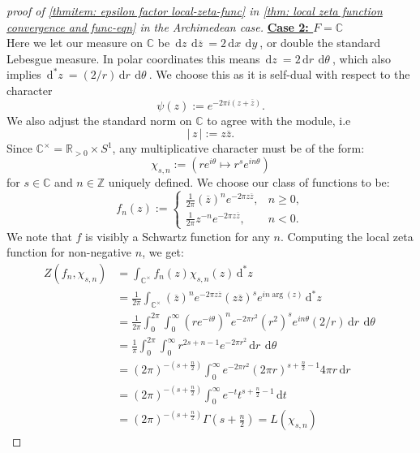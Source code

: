 \documentclass[11pt, x11names]{book}
\newcommand{\zz}{\mathbb{Z}}
\newcommand{\rr}{\mathbb{R}}
\newcommand{\cc}{\mathbb{C}}
\renewcommand{\bar}[1]{\overline{#1}}
\renewcommand{\brack}[1]{\left(   #1 \right)}
\newcommand{\abs}[1]{\left| \, #1  \,\right|}
\newcommand{\dr}{\, \mathrm{d}r \ }
\newcommand{\dt}{\, \mathrm{d}t \ }
\newcommand{\dx}{\, \mathrm{d}x \ }
\newcommand{\dy}{\, \mathrm{d}y \ }
\newcommand{\dz}{\, \mathrm{d}z \ }
\newcommand{\dtheta}{\, \mathrm{d}\theta \ }
\renewcommand{\d}[1]{\, \mathrm{d}#1 \ }
\begin{document}
\begin{proof}[proof of \ref{thmitem: epsilon factor local-zeta-func} in \ref{thm: local zeta function convergence and func-eqn} in the Archimedean case]
\textbf{\underline{Case 2: $F = \cc$}}\\
Here we let our measure on $\cc$ be $\dz \d{\bar{z}} = 2 \dx\dy$, or double the standard Lebesgue measure. In polar coordinates this means $\dz = 2 \dr \dtheta$, which also implies $\d{^*z} = (2/r) \dr \dtheta$. We choose this as it is self-dual with respect to the character
\begin{equation*}
    \psi(z) := e^{- 2 \pi i (z + \bar{z})}.
\end{equation*} 
We also adjust the standard norm on $\cc$ to agree with the module, i.e
\begin{equation*}
    \abs{z} := z \bar{z}.
\end{equation*}
Since $\cc^\times = \rr_{> 0} \times S^1$, any multiplicative character must be of the form:
\begin{equation*}
    \chi_{s, n} := (re^{i\theta} \mapsto r^s e^{i n \theta})
\end{equation*}
for $s \in \cc$ and $n \in \zz$ uniquely defined. We choose our class of functions to be:
\begin{equation*}
    f_n(z) := \begin{cases}
        \frac{1}{2\pi} \brack{\bar{z}}^n e^{- 2 \pi z \bar{z}}, & n \geq 0,\\
        \frac{1}{2\pi} z^{-n} e^{- 2 \pi z \bar{z}}, & n < 0.
    \end{cases}
\end{equation*}
We note that $f$ is visibly a Schwartz function for any $n$. Computing the local zeta function for non-negative $n$, we get:
\begin{align*}
    Z(f_n, \chi_{s, n}) &= \int_{\cc^\times} f_n(z) \chi_{s, n}(z)\d{^*z}\\
    &= \frac{1}{2\pi} \int_{\cc^\times}\brack{\bar{z}}^ne^{ - 2 \pi z \bar{z}}(z \bar{z})^s e^{i n \arg(z)}\d{^*z}\\
    &= \frac{1}{2\pi} \int^{2 \pi}_0 \int^\infty_0 (re^{-i \theta})^n e^{-2 \pi r^2} (r^2)^s e^{i n \theta} (2/r) \dr \dtheta\\
    &= \frac{1}{\pi} \int^{2\pi}_0 \int^\infty_0 r^{2s + n - 1} e^{-2 \pi r^2} \dr \dtheta\\
    &= (2 \pi)^{-\brack{s + \frac{n}{2}}} \int_0^\infty e^{- 2 \pi r^2} (2 \pi r)^{s + \frac{n}{2} - 1} 4 \pi r \dr\\
    &= (2 \pi)^{-\brack{s + \frac{n}{2}}} \int^\infty_0 e^{-t} t^{s + \frac{n}{2} - 1} \dt\\
    &= (2\pi)^{-\brack{s + \frac{n}{2}}} \Gamma(s + \frac{n}{2}) = L(\chi_{s, n})

\end{align*}
\end{proof}
\end{document}
